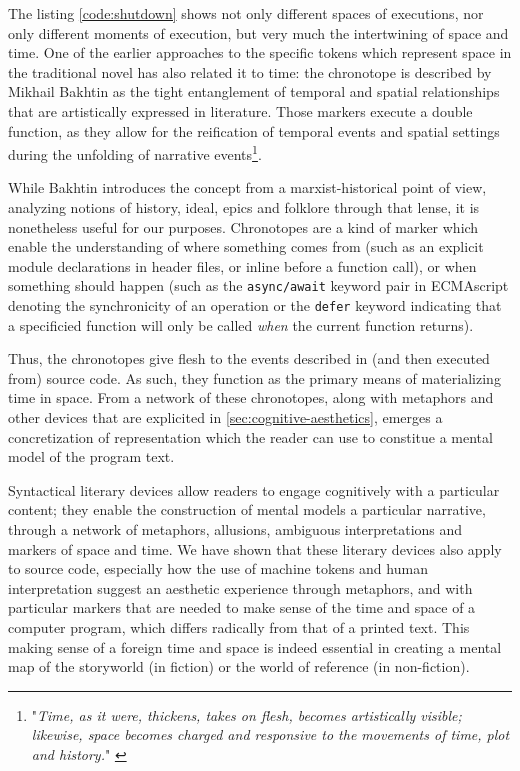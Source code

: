 The listing \autoref{code:shutdown} shows not only different spaces of executions, nor only different moments of execution, but very much the intertwining of space and time. One of the earlier approaches to the specific tokens which represent space in the traditional novel has also related it to time: the chronotope is described by Mikhail Bakhtin as the tight entanglement of temporal and spatial relationships that are artistically expressed in literature. Those markers execute a double function, as they allow for the reification of temporal events and spatial settings during the unfolding of narrative events\footnote{"\emph{Time, as it were, thickens, takes on flesh, becomes artistically visible; likewise, space becomes charged and responsive to the movements of time, plot and history.}" \citep{bakhtin_dialogic_1981}}. 

While Bakhtin introduces the concept from a marxist-historical point of view, analyzing notions of history, ideal, epics and folklore through that lense, it is nonetheless useful for our purposes. Chronotopes are a kind of marker which enable the understanding of where something comes from (such as an explicit module declarations in header files, or inline before a function call), or when something should happen (such as the \lstinline{async/await} keyword pair in ECMAscript denoting the synchronicity of an operation or the \lstinline{defer} keyword indicating that a specificied function will only be called \emph{when} the current function returns).

Thus, the chronotopes give flesh to the events described in (and then executed from) source code. As such, they function as the primary means of materializing time in space. From a network of these chronotopes, along with metaphors and other devices that are explicited in \autoref{sec:cognitive-aesthetics}, emerges a concretization of representation which the reader can use to constitue a mental model of the program text.

\spacersmall

Syntactical literary devices allow readers to engage cognitively with a particular content; they enable the construction of mental models a particular narrative, through a network of metaphors, allusions, ambiguous interpretations and markers of space and time. We have shown that these literary devices also apply to source code, especially how the use of machine tokens and human interpretation suggest an aesthetic experience through metaphors, and with particular markers that are needed to make sense of the time and space of a computer program, which differs radically from that of a printed text. This making sense of a foreign time and space is indeed essential in creating a mental map of the storyworld (in fiction) or the world of reference (in non-fiction).

